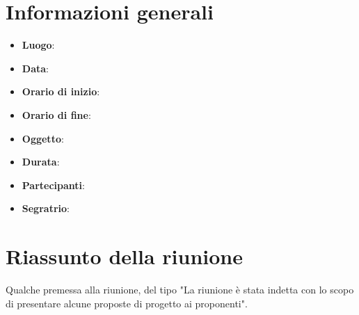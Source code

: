 \documentclass[a4paper,titlepage]{article}
\begin{document}
\maketitle
\begin{diario}
\end{diario}
\newpage
\tableofcontents

\newpage
\section{Informazioni generali}
\label{sec:Informazioni}

\begin{itemize}
  \item \textbf{Luogo}: 
  \item \textbf{Data}: 
  \item \textbf{Orario di inizio}:
  \item \textbf{Orario di fine}: 
  \item \textbf{Oggetto}:  
  \item \textbf{Durata}:
  \item \textbf{Partecipanti}:
  \item \textbf{Segratrio}:  
\end{itemize}

\newpage
\section{Riassunto della riunione}
\label{sec:RiassuntoRiunione}

Qualche premessa alla riunione, del tipo "La riunione è stata indetta con lo scopo di presentare alcune proposte di progetto ai proponenti".
\end{document}

